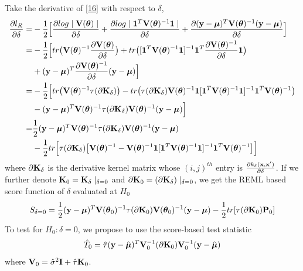 \documentclass[11pt]{article}
\begin{document}
Take the derivative of \eqref{16} with respect to $\delta$,
\begin{align}
\frac{\partial l_R}{\partial \delta}=&-\frac{1}{2}\Big[\frac{\partial log\mid {\bf V}(\boldsymbol{\theta}) \mid}{\partial \delta}+\frac{\partial log \mid \mathbf{1}^T{\bf V}(\boldsymbol{\theta})^{-1}\mathbf{1} \mid}{\partial \delta}+ \frac{\partial ({\bf y}-\boldsymbol{\mu})^T{\bf V}(\boldsymbol{\theta})^{-1}({\bf y}-\boldsymbol{\mu})}{\partial \delta}\Big]\nonumber \\
=&-\frac{1}{2}\Big[tr\big({\bf V}(\boldsymbol{\theta})^{-1}\frac{\partial {\bf V}(\boldsymbol{\theta})}{\partial \delta}\big)+tr\big([\mathbf{1}^T{\bf V}(\boldsymbol{\theta})^{-1}\mathbf{1}]^{-1}\mathbf{1}^T\frac{\partial {\bf V}(\boldsymbol{\theta})^{-1}}{\partial \delta}\mathbf{1}\big)\nonumber \\
&+({\bf y}-\boldsymbol{\mu})^T\frac{\partial {\bf V}(\boldsymbol{\theta})^{-1}}{\partial \delta}({\bf y}-\boldsymbol{\mu}) \Big]\nonumber \\
=&-\frac{1}{2}\Big[tr\big({\bf V}(\boldsymbol{\theta})^{-1}\tau (\partial {\bf K}_\delta)\big)-tr\big(\tau (\partial {\bf K}_\delta){\bf V}(\boldsymbol{\theta})^{-1}\mathbf{1}[\mathbf{1}^T{\bf V}(\boldsymbol{\theta})^{-1}\mathbf{1}]^{-1}\mathbf{1}^T{\bf V}(\boldsymbol{\theta})^{-1}\big)\nonumber \\
&-({\bf y}-\boldsymbol{\mu})^T{\bf V}(\boldsymbol{\theta})^{-1}\tau (\partial {\bf K}_\delta){\bf V}(\boldsymbol{\theta})^{-1}({\bf y}-\boldsymbol{\mu}) \Big]\nonumber \\
=&\frac{1}{2}({\bf y}-\boldsymbol{\mu})^T{\bf V}(\boldsymbol{\theta})^{-1}\tau (\partial {\bf K}_\delta){\bf V}(\boldsymbol{\theta})^{-1}({\bf y}-\boldsymbol{\mu})\nonumber \\
&-\frac{1}{2}tr\Big[\tau (\partial {\bf K}_\delta)\big[{\bf V}(\boldsymbol{\theta})^{-1}-{\bf V}(\boldsymbol{\theta})^{-1}\mathbf{1}[\mathbf{1}^T{\bf V}(\boldsymbol{\theta})^{-1}\mathbf{1} ]^{-1}\mathbf{1}^T{\bf V}(\boldsymbol{\theta})^{-1}\big]\Big] \label{17}
\end{align}
where $\partial {\bf K}_\delta$ is the derivative kernel matrix whose $(i,j)^{th}$ entry is $\frac{\partial k_\delta({\bf x}, {\bf x}')}{\partial \delta}$. If we further denote ${\bf K}_0={\bf K}_\delta \mid_{\delta=0}$ and $\partial {\bf K}_0=(\partial {\bf K}_\delta)\mid_{\delta=0}$, we get the REML based score function of $\delta$ evaluated at $H_0$
\begin{align*}
S_{\delta=0}=\frac{1}{2}({\bf y}-\boldsymbol{\mu})^T{\bf V}(\boldsymbol{\theta}_0)^{-1}\tau (\partial {\bf K}_0){\bf V}(\boldsymbol{\theta}_0)^{-1}({\bf y}-\boldsymbol{\mu})-\frac{1}{2}tr[\tau (\partial {\bf K}_0){\bf P}_0]
\end{align*}
To test for $H_0: \delta=0$, we propose to use the score-based test statistic
\begin{align}
\hat{T}_0=\hat{\tau}({\bf y}-\hat{\boldsymbol{\mu}})^T{\bf V}_0^{-1} (\partial {\bf K}_0){\bf V}_0^{-1}({\bf y}-\hat{\boldsymbol{\mu}})
\end{align}
where ${\bf V}_0=\hat{\sigma}^2{\bf I}+\hat{\tau}{\bf K}_0$.
\end{document}
